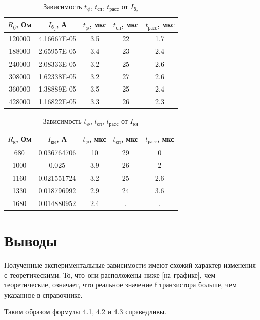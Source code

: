 \begin{table}[H]
	\begin{center}
	\caption{Зависимость $t_\phi$, $t_\text{сп}$, $t_\text{расс}$ от $I_{\text{б}_2}$}
		\begin{tabular}{|c|c|c|c|c|}
		\hline 
		$R_\text{б}$, Ом & $I_{\text{б}_2}$, А & $t_\phi$, мкс & $t_\text{сп}$, мкс & $t_\text{расс}$, мкс \\ 
		\hline 
		120000 & 4.16667E-05 & 3.5 & 22 & 1.7 \\
		\hline
		188000 & 2.65957E-05 & 3.4 & 23 & 2.4 \\
		\hline
		240000 & 2.08333E-05 & 3.2 & 25	& 2.6 \\
		\hline
		308000 & 1.62338E-05 & 3.2 & 27 & 2.6 \\
		\hline
		360000 & 1.38889E-05 & 3.5 & 25 & 2.4 \\
		\hline
		428000 & 1.16822E-05 & 3.3 & 26 & 2.3 \\
		\hline
		\end{tabular} 
		\label{tabular:4}
	\end{center}
\end{table}


\begin{table}[H]
	\begin{center}
	\caption{Зависимость $t_\phi$, $t_\text{сп}$, $t_\text{расс}$ от $I_{\text{кн}}$}
		\begin{tabular}{|c|c|c|c|c|}
		\hline 
		$R_\text{к}$, Ом & $I_{\text{кн}}$, А & $t_\phi$, мкс & $t_\text{сп}$, мкс & $t_\text{расс}$, мкс \\ 
		\hline 
		680 & 0.036764706 & 10 & 29 & 0 \\
		\hline
		1000 & 0.025 & 3.9 & 26 & 2 \\
		\hline
		1160 & 0.021551724 & 3.2 & 25 & 2.6 \\
		\hline
		1330 & 0.018796992 & 2.9 & 24 & 3.6 \\
		\hline
		1680 & 0.014880952 & 2.4 & . & . \\
		\hline
		\end{tabular} 
		\label{tabular:5}
	\end{center}
\end{table}


\section{Выводы}

Полученные экспериментальные зависимости имеют схожий характер изменения с теоретическими. То, что они расположены ниже [на графике], чем теоретические, означает, что реальное значение f транзистора больше, чем указанное в справочнике. 

Таким образом формулы 4.1, 4.2 и 4.3 справедливы.


